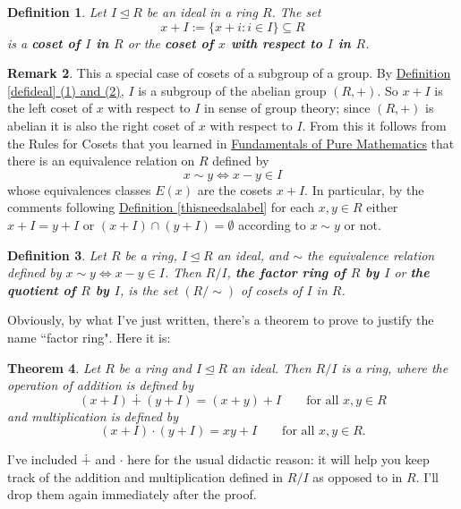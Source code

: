 \documentclass[11pt]{amsbook}
\newtheorem{theorem}{Theorem}[section]
\newtheorem{definition}[theorem]{Definition}
\theoremstyle{definition}
\newtheorem{rem}[theorem]{Remark}
\begin{document}
\begin{definition} Let $I\unlhd R$ be an ideal in a ring $R$. The set $$ x+I := \{ x + i : i\in I \} \subseteq R$$ is a {\bf coset of $I$ in $R$} or the {\bf coset of $x$ with respect to $I$ in $R$}.
\end{definition}
\begin{rem} This a special case of cosets of a subgroup of a group. By \hyperref[defideal]{Definition \ref{defideal} (1) and (2)}, $I$ is a subgroup of the abelian group $(R, +)$. So $x+I$ is the left coset of $x$ with respect to $I$ in sense of group theory; since $(R, +)$ is abelian it is also the right coset of $x$ with respect to $I$. From this it follows from the Rules for Cosets that you learned in \href{http://www.drps.ed.ac.uk/12-13/dpt/cxmath08064.htm}{Fundamentals of Pure Mathematics} that there is an equivalence relation on $R$ defined by $$x\sim y \Leftrightarrow x-y \in I$$ whose equivalences classes $E(x)$ are the cosets $x+I$. In particular, by the comments following \hyperref[equivclasspartition]{Definition \ref{thisneedsalabel}} for each $x,y\in R$ either $x+I = y+I$ or $(x+I)\cap (y+I) = \emptyset$ according to $x\sim y$ or not.
\end{rem}

\begin{definition}
Let $R$ be a ring, $I\unlhd R$ an ideal, and $\sim$ the equivalence relation defined by $x\sim y \Leftrightarrow x-y\in I$. Then $R/I$, {\bf the factor ring of $R$ by $I$} or {\bf the quotient of $R$ by $I$}, is the set $(R/\sim)$ of cosets of $I$ in $R$.
\end{definition}

Obviously, by what I've just written, there's a theorem to prove to justify the name ``factor ring". Here it is:

\begin{theorem}\label{factorringthm}
Let $R$ be a ring and $I\unlhd R$ an ideal. Then $R/I$ is a ring, where the operation of addition is defined by
$$ (x+I ) \dotplus (y+ I )  = (x+y) +I \qquad \text{for all $x,y\in R$}$$ and multiplication is defined by  $$(x+I)\cdot (y+I) = xy + I \qquad \text{for all $x,y\in R$}.$$
\end{theorem}
I've included $\dotplus$ and $\cdot$ here for the usual didactic reason: it will help you keep track of the addition and multiplication defined in $R/I$ as opposed to in $R$. I'll drop them again immediately after the proof.
\end{document}
